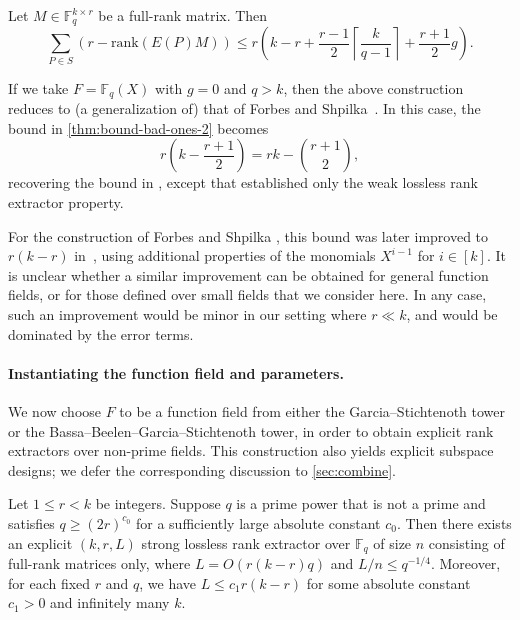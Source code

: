 \documentclass[11pt]{article}
\newcommand{\rank}{\mathrm{rank}}
\newcommand{\F}{\mathbb{F}}
\begin{document}
\begin{theorem}\label{thm:bound-bad-ones-2}
Let $M\in \mathbb{F}_q^{k\times r}$ be a full-rank matrix. 
Then 
\[
\sum_{P\in S} (r-\rank(E(P)M))\leq r\left(
k-r+\frac{r-1}{2}\left\lceil \frac{k}{q-1}\right\rceil+\frac{r+1}{2}g
\right).
\]
\end{theorem}

\begin{remark}\label{rem:fs}
If we take $F=\F_q(X)$ with $g=0$ and $q>k$, then the above construction reduces to (a generalization of) that of Forbes and Shpilka~\cite{FS12}. In this case, the bound in \cref{thm:bound-bad-ones-2} becomes
\[
r\left(k-\frac{r+1}{2}\right)=rk-\binom{r+1}{2},
\]
recovering the bound in \cite{FS12}, except that \cite{FS12} established only the weak lossless rank extractor property.

For the construction of Forbes and Shpilka \cite{FS12}, this bound was later improved to $r(k-r)$ in~\cite{FSS14,For14}, using additional properties of the monomials $X^{i-1}$ for $i\in [k]$. It is unclear whether a similar improvement can be obtained for general function fields, or for those defined over small fields that we consider here. In any case, such an improvement would be minor in our setting where $r\ll k$, and would be dominated by the error terms.
\end{remark}

\paragraph{Instantiating the function field and parameters.}

We now choose $F$ to be a function field from either the Garcia--Stichtenoth tower or the Bassa--Beelen--Garcia--Stichtenoth tower, in order to obtain explicit rank extractors over non-prime fields. This construction also yields explicit subspace designs; we defer the corresponding discussion to \cref{sec:combine}.

\begin{theorem}\label{thm:fullrankbound}
Let $1\le r<k$ be integers. 
Suppose $q$ is a prime power that is not a prime and satisfies $q\ge (2r)^{c_0}$ for a sufficiently large absolute constant $c_0$. Then there exists an explicit $(k,r,L)$ strong lossless rank extractor over $\F_q$ of size $n$ consisting of full-rank matrices only, where $L=O(r(k-r)q)$ and $L/n\le q^{-1/4}$.
Moreover, for each fixed $r$ and $q$, we have $L\le c_1 r(k-r)$ for some absolute constant $c_1>0$ and infinitely many $k$.
\end{theorem}
\end{document}
